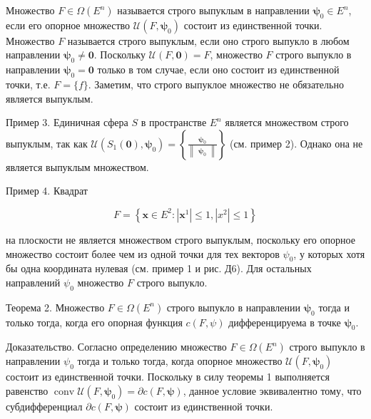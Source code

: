 \documentclass[8pt]{extarticle}
\begin{document}
Множество \(F \in  \Omega \left( {E}^{n}\right)\) называется строго выпуклым в направлении \({\mathbf{\psi }}_{0} \in  {E}^{n}\), если его опорное множество \(\mathcal{U}\left( {F,{\mathbf{\psi }}_{0}}\right)\) состоит из единственной точки. Множество \(F\) называется строго выпуклым, если оно строго выпукло в любом направлении \({\mathbf{\psi }}_{0} \neq  \mathbf{0}\). Поскольку \(\mathcal{U}\left( {F,\mathbf{0}}\right)  = F\), множество \(F\) строго выпукло в направлении \({\mathbf{\psi }}_{0} = \mathbf{0}\) только в том случае, если оно состоит из единственной точки, т.е. \(F = \{f\}\). Заметим, что строго выпуклое множество не обязательно является выпуклым.

Пример 3. Единичная сфера \(S\) в пространстве \({E}^{n}\) является множеством строго выпуклым, так как \(\mathcal{U}\left( {{S}_{1}\left( \mathbf{0}\right) ,{\mathbf{\psi }}_{0}}\right)  = \left\{  \frac{{\mathbf{\psi }}_{0}}{\left\lVert \begin{array}{c} {\mathbf{\psi }}_{0} \end{array} \right\rVert}\right\}\) (см. пример 2). Однако она не является выпуклым множеством.

Пример 4. Квадрат

\[
F = \left\{  {\mathbf{x} \in  {E}^{2} : \left| {\mathbf{x}}^{1}\right|  \leq  1,\left| {x}^{2}\right|  \leq  1}\right\}
\]

на плоскости не является множеством строго выпуклым, поскольку его опорное множество состоит более чем из одной точки для тех векторов \({\psi }_{0}\), у которых хотя бы одна координата нулевая (см. пример 1 и рис. Д6). Для остальных направлений \({\psi }_{0}\) множество \(F\) строго выпукло.

Теорема 2. Множество \(F \in  \Omega \left( {E}^{n}\right)\) строго выпукло в направлении \({\mathbf{\psi }}_{0}\) тогда и только тогда, когда его опорная функция \(c\left( {F,\psi }\right)\) дифференцируема в точке \({\mathbf{\psi }}_{0}\).

Доказательство. Согласно определению множество \(F \in  \Omega \left( {E}^{n}\right)\) строго выпукло в направлении \({\psi }_{0}\) тогда и только тогда, когда опорное множество \(\mathcal{U}\left( {F,{\mathbf{\psi }}_{0}}\right)\) состоит из единственной точки. Поскольку в силу теоремы 1 выполняется равенство \(\operatorname{conv}\mathcal{U}\left( {F,{\mathbf{\psi }}_{0}}\right)  = \partial c\left( {F,\mathbf{\psi }}\right)\), данное условие эквивалентно тому, что субдифференциал \(\partial c\left( {F,\mathbf{\psi }}\right)\) состоит из единственной точки.
\end{document}
